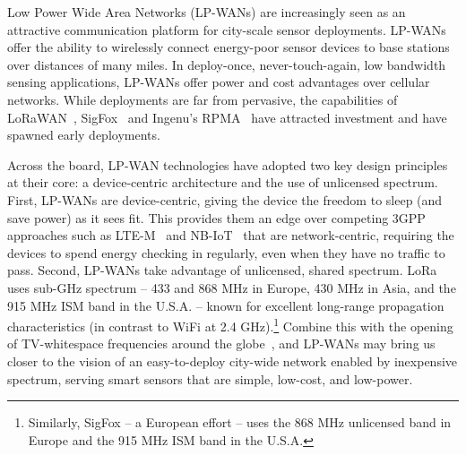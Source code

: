 Low Power Wide Area Networks (LP-WANs) are increasingly seen as an attractive communication platform for city-scale sensor deployments. LP-WANs offer the ability to wirelessly connect energy-poor sensor devices to base stations over distances of many miles. In deploy-once, never-touch-again, low bandwidth sensing applications, LP-WANs offer power and cost advantages over cellular networks.  While deployments are far from pervasive, the capabilities of LoRaWAN~\cite{Sornin2015, LoRaWanAlliance2015}, SigFox~\cite{centenaro2016} and Ingenu's RPMA~\cite{Ingenu2015} have attracted investment and have spawned early deployments.  

Across the board, LP-WAN technologies have adopted two key design principles at their core: a device-centric architecture and the use of unlicensed spectrum. First, LP-WANs are device-centric, giving the device the freedom to sleep (and save power) as it sees fit. This provides them an edge over competing 3GPP approaches such as LTE-M~\cite{GSMAssociation2016} and NB-IoT~\cite{Ratasuk2016} that are network-centric, requiring the devices to spend energy checking in regularly, even when they have no traffic to pass. Second, LP-WANs take advantage of  unlicensed, shared spectrum.  LoRa uses sub-GHz spectrum -- 433 and 868 MHz in Europe, 430 MHz in Asia, and the 915 MHz ISM band in the U.S.A. -- known for excellent long-range propagation characteristics (in contrast to WiFi at 2.4 GHz).\footnote{Similarly, SigFox -- a European effort -- uses the 868 MHz unlicensed band in Europe and the 915 MHz ISM band in the U.S.A.} Combine this with  the opening of TV-whitespace frequencies around the globe~\cite{FCC_Whitespaces}, and LP-WANs may bring us closer to the vision of an easy-to-deploy city-wide network enabled by inexpensive spectrum, serving smart sensors that are simple, low-cost, and low-power. 




